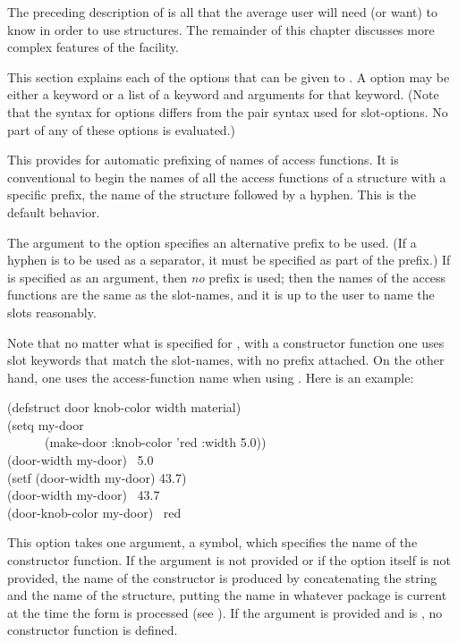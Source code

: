 The preceding description of  is all that the average
user will need (or want) to know in order to use structures.
The remainder of this chapter discusses more complex features of
the  facility.

This section explains each of the options that can be given to .
A  option may be either a keyword
or a list of a keyword and arguments for that keyword.
(Note that the syntax for  options differs from
the pair syntax used for slot-options.  No part of any of these options
is evaluated.)

\begin{flushdesc}
\item[\cd{:conc-name}]
This provides for automatic prefixing of names of access functions.
It is conventional to begin the names of all the access functions of
a structure with a specific prefix,
the name of the structure followed by a hyphen.
This is the default behavior.

The argument to the  option specifies an alternative
prefix to be used.  (If a hyphen is to be used as a separator,
it must be specified as part of the prefix.)
If {\false} is specified as an argument, then \emph{no} prefix is used;
then the names of the access functions
are the same as the slot-names, and it is up to the user
to name the slots reasonably.

Note that no matter what is specified for ,
with a constructor function one uses
slot keywords that match the slot-names, with no prefix attached.
On the other hand, one uses the access-function name
when using .  Here is an example:
\begin{lisp}
(defstruct door knob-color width material) \\
(setq my-door \\
~~~~~~(make-door :knob-color 'red :width 5.0)) \\
(door-width my-door) \EV\ 5.0 \\
(setf (door-width my-door) 43.7) \\
(door-width my-door) \EV\ 43.7 \\
(door-knob-color my-door) \EV\ red
\end{lisp}

\item[\cd{:constructor}]
This option takes one argument, a symbol,
which specifies the name of the constructor
function.  If the argument is not provided or if the option itself is not
provided, the name of the constructor is produced by concatenating the
string  and the name of the structure, putting the name
in whatever package is current at the time the 
form is processed (see ).
If the argument is
provided and is {\false}, no constructor function is defined.


\end{flushdesc}
